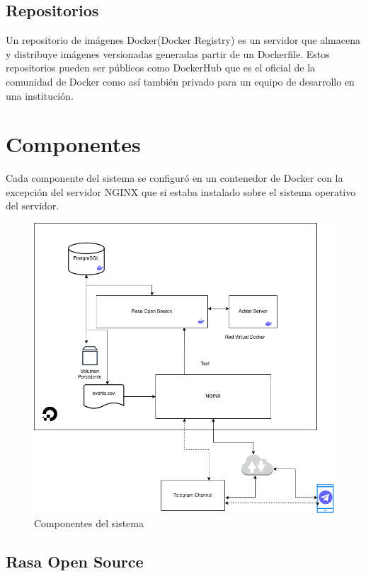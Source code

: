 \subsection{Repositorios}
Un repositorio de imágenes Docker(Docker Registry) es un servidor que almacena y distribuye
imágenes versionadas generadas partir de un Dockerfile. Estos repositorios pueden ser públicos como
DockerHub que es el oficial de la comunidad de Docker como así también privado para un equipo de
desarrollo en una institución.
\cite{Docker}

\section{Componentes}

Cada componente del sistema se configuró en un contenedor de Docker con la excepción del servidor
NGINX que si estaba instalado sobre el sistema operativo del servidor.
\begin{figure}[ht]
	\centering
	\includegraphics[width=\textwidth]{imagenes/cap4/server.png}
	\caption{Componentes del sistema}
	\label{fig:server_diagram}
\end{figure}

\subsection{Rasa Open Source}

